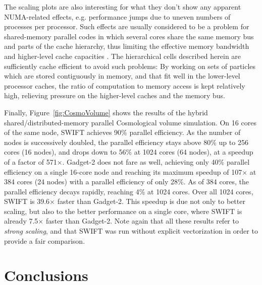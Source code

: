 \documentclass[final]{siamltex}
\newcommand{\fig}[1]
    {Figure~\ref{fig:#1}}
\begin{document}
The scaling plots are also interesting for what they don't show
any apparent NUMA-related effects, e.g. performance jumps due to
uneven numbers of processes per processor.
Such effects are usually
considered to be a problem for shared-memory parallel codes in
which several cores share the same memory bus and parts of
the cache hierarchy, thus limiting the effective memory bandwidth
and higher-level cache capacities \cite{ref:Thacker2006}.
The hierarchical cells described herein are sufficiently
cache efficient to avoid such problems: By working on sets
of particles which are stored contiguously in memory,
and that fit well in the lower-level processor caches, the ratio
of computation to memory access is kept relatively high, relieving
pressure on the higher-level caches and the memory bus.

Finally, \fig{CosmoVolume} shows the results of the hybrid
shared/distributed-memory parallel Cosmological volume simulation.
On 16 cores of the same node, SWIFT achieves 90\% parallel efficiency.
As the number of nodes is successively doubled, the parallel
efficiency stays above 80\% up to 256 cores (16 nodes), and
drops down to 56\% at 1024 cores (64 nodes), at a speedup
of a factor of 571$\times$.
Gadget-2 does not fare as well, achieving only 40\% parallel efficiency
on a single 16-core node and reaching its maximum speedup of 107$\times$ at
384 cores (24 nodes) with a parallel efficiency of only 28\%.
As of 384 cores, the parallel efficiency decays rapidly, reaching
4\% at 1024 cores.
Over all 1024 cores, SWIFT is 39.6$\times$ faster than Gadget-2.
This speedup is due not only to better scaling, but also to
the better performance on a single core, where SWIFT is already
7.5$\times$ faster than Gadget-2.
Note again that all these results refer to {\em strong scaling},
and that SWIFT was run without explicit vectorization in order
to provide a fair comparison.


% 
%         


\section{Conclusions}
\end{document}
